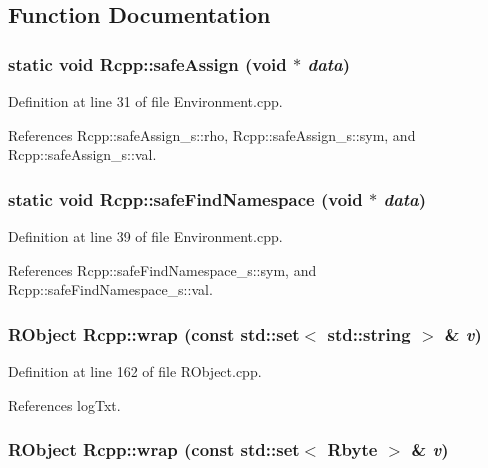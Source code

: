 \subsection{Function Documentation}
\hypertarget{namespaceRcpp_a2d80463328ec91b260619bbe65c50f5e}{
\subsubsection[{safeAssign}]{\setlength{\rightskip}{0pt plus 5cm}static void Rcpp::safeAssign (void $\ast$ {\em data})}}
\label{namespaceRcpp_a2d80463328ec91b260619bbe65c50f5e}


Definition at line 31 of file Environment.cpp.

References Rcpp::safeAssign\_\-s::rho, Rcpp::safeAssign\_\-s::sym, and Rcpp::safeAssign\_\-s::val.\hypertarget{namespaceRcpp_a669f9e0719ba170ec1b3b5dd2ba45406}{
\subsubsection[{safeFindNamespace}]{\setlength{\rightskip}{0pt plus 5cm}static void Rcpp::safeFindNamespace (void $\ast$ {\em data})}}
\label{namespaceRcpp_a669f9e0719ba170ec1b3b5dd2ba45406}


Definition at line 39 of file Environment.cpp.

References Rcpp::safeFindNamespace\_\-s::sym, and Rcpp::safeFindNamespace\_\-s::val.\hypertarget{namespaceRcpp_af6e357808cee5d58e137867916b1d04c}{
\subsubsection[{wrap}]{\setlength{\rightskip}{0pt plus 5cm}RObject Rcpp::wrap (const std::set$<$ std::string $>$ \& {\em v})}}
\label{namespaceRcpp_af6e357808cee5d58e137867916b1d04c}


Definition at line 162 of file RObject.cpp.

References logTxt.\hypertarget{namespaceRcpp_ab9e1f40cf7583da1f54a8e6c5f7e9f3a}{
\subsubsection[{wrap}]{\setlength{\rightskip}{0pt plus 5cm}RObject Rcpp::wrap (const std::set$<$ Rbyte $>$ \& {\em v})}}
\label{namespaceRcpp_ab9e1f40cf7583da1f54a8e6c5f7e9f3a}


